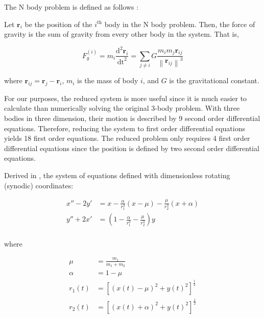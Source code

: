 \documentclass{article}
\begin{document}
\newcommand{\norm}[1]{\left\lVert#1\right\rVert}
\newcommand{\rv}{\mathbf{r}}
The N body problem is defined as follows \cite{chenciner2000remarkable}:

Let $\rv_i$ be the position of the $i^\text{th}$ body in the N body problem.
Then, the force of gravity is the sum of gravity from every other body in the system.
That is, 

\begin{equation}
   F_g^{(i)} = m_i \frac{\mathrm{d}^2 \rv_i}{\mathrm{dt}^2} =
   \sum_{j \neq i} G \frac{m_i m_j \hat{\rv}_{ij}}{\norm{\rv_{ij}}^3}
   \label{eq:nbody}
\end{equation}

where $\rv_{ij} = \rv_j - \rv_i$, $m_i$ is the mass of body $i$, and $G$ is the gravitational constant.

For our purposes, the reduced system is more useful since it is much easier to calculate than numerically solving the original 3-body problem. With three bodies in three dimension, their motion is described by 9 second order differential equations. Therefore, reducing the system to first order differential equations yields 18 first order equations. The reduced problem only requires 4 first order differential equations since the position is defined by two second order differential equations.

Derived in \cite{eberle2007case}, the system of equations defined with dimensionless rotating (synodic) coordinates:

\begin{align}
    x'' - 2 y' &= x
        - \frac{\alpha}{r_1^3} (x - \mu)
        - \frac{\mu}{r_2^3} (x + \alpha) \nonumber \\
    y'' + 2 x' &= \left(
        1 - \frac{\alpha}{r_1^3}
        - \frac{\mu}{r_2^3}
    \right) y \nonumber \\
\end{align}

where 

\begin{align}
    \mu &= \frac{m_1}{m_1 + m_2} \nonumber \\
    \alpha &= 1 - \mu \nonumber \\
    r_1(t) &= \left[(x(t) - \mu)^2 + y(t)^2\right]^{\frac{1}{2}} \nonumber \\
    r_2(t) &= \left[(x(t) + \alpha)^2 + y(t)^2\right]^{\frac{1}{2}} \label{eq:reduc_3body_cor}
\end{align}
 
\end{document}
